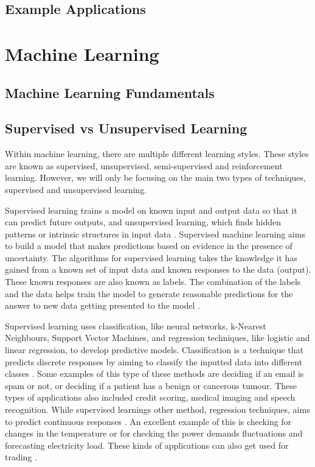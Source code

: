 	
	\subsection{Example Applications}
	

	\section{Machine Learning}
	
	\subsection{Machine Learning Fundamentals}
	
	
	\subsection{Supervised vs Unsupervised Learning}
	Within machine learning, there are multiple different learning styles. These styles are known as supervised, unsupervised, semi-supervised and reinforcement learning. However, we will only be focusing on the main two types of techniques, supervised and unsupervised learning. 
	
	Supervised learning trains a model on known input and output data so that it can predict future outputs, and unsupervised learning, which finds hidden patterns or intrinsic structures in input data \cite{geron2019hands}. Supervised machine learning aims to build a model that makes predictions based on evidence in the presence of uncertainty. The algorithms for supervised learning takes the knowledge it has gained from a known set of input data and known responses to the data (output). These known responses are also known as labels. The combination of the labels and the data helps train the model to generate reasonable predictions for the answer to new data getting presented to the model \cite{matlanintrotoml, geron2019hands}. 
	
	Supervised learning uses classification, like neural networks, k-Nearest Neighbours, Support Vector Machines, and regression techniques, like logistic and linear regression, to develop predictive models.  Classification is a technique that predicts discrete responses by aiming to classify the inputted data into different classes \cite{matlanintrotoml}. Some examples of this type of these methods are deciding if an email is spam or not, or deciding if a patient has a benign or cancerous tumour. These types of applications also included credit scoring, medical imaging and speech recognition. While supervised learnings other method, regression techniques, aims to predict continuous responses \cite{geron2019hands}. An excellent example of this is checking for changes in the temperature or for checking the power demands fluctuations and forecasting electricity load. These kinds of applications can also get used for trading  \cite{matlanintrotoml}.
	
